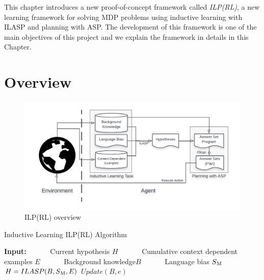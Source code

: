 This chapter introduces a new proof-of-concept framework called \textit{ILP(RL)}, a new learning framework for solving MDP problems using inductive learning with ILASP and planning with ASP.
The development of this framework is one of the main objectives of this project and we explain the framework in details in this Chapter.

\section{Overview}
\label{sec:overview}

\begin{figure}[!htb]
\centering
\includegraphics[width=1.0\textwidth]{./figures/architecture}
\caption{ILP(RL) overview}
\label{fig:ILPRL_overview}
\end{figure}


\begin{algorithm}
\caption{Inductive Learning ILP(RL) Algorithm}
\label{algorithm:inductive_learning}
\begin{algorithmic}[1]
\label{algo:ILPRL}
\renewcommand{\algorithmicrequire}{\textbf{Input:}}
\State \textbf{Input:}
\State \ \ \ \ \ \ Current hypothesis $H$
\State \ \ \ \ \ \ Cumulative context dependent examples $E$
\State \ \ \ \ \ \ Background knowledge$B$
\State \ \ \ \ \ \ Language bias $S\textsubscript{M}$ \\
\State $H = ILASP(B, S\textsubscript{M}, E)$
\EndIf
\State $Update(B, e)$

\EndProcedure
\end{algorithmic}
\end{algorithm}



